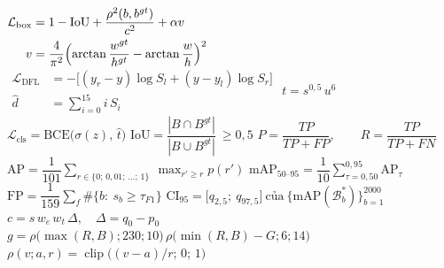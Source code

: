 \documentclass[border=1.5pt,multi=eqn]{standalone}
\newenvironment{eqn}[1]{\fontsize{18}{22}\selectfont\color[HTML]{#1}$\displaystyle}{$}
\begin{document}
\begin{eqn}{0E2238}\begin{aligned}\mathcal{L}_{\text{box}}&=1-\mathrm{IoU}+\dfrac{\rho^{2}(b,b^{gt})}{c^{2}}+\alpha v\\ v&=\dfrac{4}{\pi^{2}}\Bigl(\arctan\dfrac{w^{gt}}{h^{gt}}-\arctan\dfrac{w}{h}\Bigr)^{2}\end{aligned}\end{eqn}
\begin{eqn}{0E2238}\begin{aligned}\mathcal{L}_{\text{DFL}}&=-\bigl[(y_{r}-y)\log S_{l}+(y-y_{l})\log S_{r}\bigr]\\ \hat d&=\textstyle\sum_{i=0}^{15}i\,S_i\end{aligned}\end{eqn}
\begin{eqn}{0E2238}t=s^{0{,}5}\,u^{6}\end{eqn}
\begin{eqn}{0E2238}\mathcal{L}_{\text{cls}}=\mathrm{BCE}\bigl(\sigma(z),\,\hat t\bigr)\end{eqn}
\begin{eqn}{0E2238}\mathrm{IoU}=\dfrac{|B\cap B^{gt}|}{|B\cup B^{gt}|}\ \ge 0{,}5\end{eqn}
\begin{eqn}{0E2238}P=\dfrac{TP}{TP+FP},\qquad R=\dfrac{TP}{TP+FN}\end{eqn}
\begin{eqn}{0E2238}\mathrm{AP}=\dfrac{1}{101}\sum_{r\in\{0;\,0{,}01;\,\dots;\,1\}}\ \max_{r'\ge r}p(r')\end{eqn}
\begin{eqn}{0E2238}\mathrm{mAP}_{50\text{–}95}=\dfrac{1}{10}\sum_{\tau=0{,}50}^{0{,}95}\mathrm{AP}_{\tau}\end{eqn}
\begin{eqn}{0E2238}\mathrm{FP}=\dfrac{1}{159}\sum_{f}\#\bigl\{b:\ s_b\ge\tau_{F1}\bigr\}\end{eqn}
\begin{eqn}{0E2238}\mathrm{CI}_{95}=\bigl[q_{2{,}5};\ q_{97{,}5}\bigr]\ \text{của}\ \bigl\{\mathrm{mAP}(\mathcal{B}^{*}_{b})\bigr\}_{b=1}^{2000}\end{eqn}
\begin{eqn}{0E2238}c=s\,w_e\,w_t\,\Delta,\quad \Delta=q_0-p_0\end{eqn}
\begin{eqn}{0E2238}g=\rho\bigl(\max(R,B);230;10\bigr)\,\rho\bigl(\min(R,B)-G;6;14\bigr)\end{eqn}
\begin{eqn}{0E2238}\rho(v;a,r)=\operatorname{clip}\bigl((v-a)/r;\,0;\,1\bigr)\end{eqn}
\end{document}

